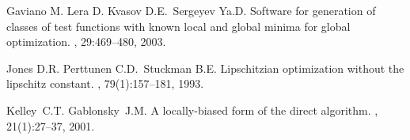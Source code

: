 \documentclass[a4paper]{article}
\begin{document}
\begin{thebibliography}{10}
Gaviano M. Lera D. Kvasov D.E.~Sergeyev Ya.D.
\newblock Software for generation of classes of test functions with known local
  and global minima for global optimization.
, 29:469--480, 2003.

Jones D.R. Perttunen C.D.~Stuckman B.E.
\newblock Lipschitzian optimization without the lipschitz constant.
,
  79(1):157–181, 1993.

Kelley~C.T. Gablonsky~J.M.
\newblock A locally-biased form of the direct algorithm.
, 21(1):27--37, 2001.

\end{thebibliography}
\end{document}
